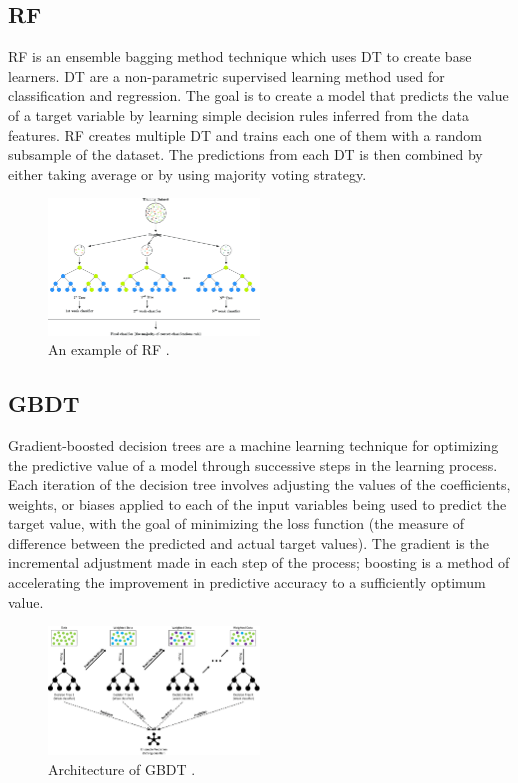 \documentclass[twoside,11pt,a4paper]{article}
\begin{document}
\subsection{\acf{RF}}
\acf{RF} is an ensemble bagging method technique which uses \acf{DT} to create base learners. \acs{DT} are a non-parametric supervised learning method used for classification and regression. The goal is to create a model that predicts the value of a target variable by learning simple decision rules inferred from the data features. \acs{RF} creates multiple \acs{DT} and trains each one of them with a random subsample of the dataset. The predictions from each \acs{DT} is then combined by either taking average or by using majority voting strategy.\\
\begin{figure}[ht]
	\centering
	\includegraphics[width=0.5\textwidth]{random_forest}
	\caption[An example \acs{RF}. ]{An example of \acf{RF} \cite{sapountzoglou2020fault}.}
	\label{fig:random_forest}
\end{figure}

\subsection{\acf{GBDT}}
Gradient-boosted decision trees are a machine learning technique for optimizing the predictive value of a model through successive steps in the learning process. Each iteration of the decision tree involves adjusting the values of the coefficients, weights, or biases applied to each of the input variables being used to predict the target value, with the goal of minimizing the loss function (the measure of difference between the predicted and actual target values). The gradient is the incremental adjustment made in each step of the process; boosting is a method of accelerating the improvement in predictive accuracy to a sufficiently optimum value.
\begin{figure}[ht]
	\centering
	\includegraphics[width=0.5\textwidth]{gbdt}
	\caption[Architecture of \acf{GBDT}]{Architecture of \acf{GBDT} \cite{deng2021ensemble}.}
	\label{fig:gbdt}
\end{figure}
\end{document}
